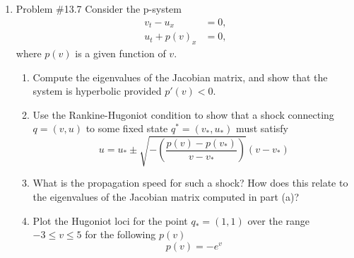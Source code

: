 \documentclass[11pt]{article}
\begin{document}
\begin{enumerate}
    \item Problem \#13.7
    		Consider the p-system 
    		\begin{align*}
    		v_t-u_x&=0,\\
    		u_t+p(v)_x&=0,
    		\end{align*}
    		where $p(v)$ is a given function of $v$.
    		\begin{enumerate}
    		\item
    			Compute the eigenvalues of the Jacobian matrix, and show that the system is hyperbolic provided $p'(v)<0$.
    		\item
    			Use the Rankine-Hugoniot condition to show that a shock connecting $q=(v,u)$ to some fixed state $q^*=(v_*,u_*)$ must satisfy 
    			\[
    			u=u_*\pm\sqrt{-(\frac{p(v)-p(v_*)}{v-v_*})}(v-v_*)
    			\]
    		\item
    			What is the propagation speed for such a shock? How does this relate to the eigenvalues of the Jacobian matrix computed in part (a)?
    		\item
    			Plot the Hugoniot loci for the point $q_*=(1,1)$ over the range $-3\leq v\leq 5$ for the following $p(v)$
    			\[
    			p(v)=-e^v
    			\]
    		\end{enumerate}
      		    
		\vskip 5pt
        \vskip 5pt
        	

\end{enumerate}
\end{document}
